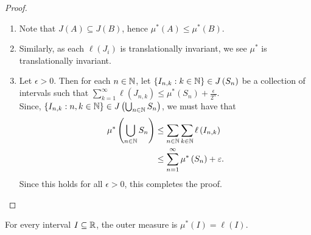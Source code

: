 \begin{proof}
	\begin{enumerate}
		\item Note that \(J\left( A \right) \subseteq J\left( B \right) \), hence \( \mu^{*} \left( A \right)  \le \mu^{*} \left( B \right) \).
		\item Similarly, as each \(\ell\left( J_{i} \right) \) is translationally invariant, we see \( \mu^{*}\) is translationally invariant.
		\item Let \(\epsilon >0\). Then for  each \(n \in \mathbb{N}\), let \(\{I_{n, k} : k \in \mathbb{N}\} \in J\left( S_{n} \right) \) be a collection of intervals such that \(\sum_{k=1}^{\infty} \ell\left( J_{n, k} \right)  \le \mu^{*}\left( S_{n} \right) + \frac{\epsilon}{2^{n}} \).\\
			Since, \(\{I_{n, k} : n, k \in \mathbb{N}\} \in J\left( \bigcup_{n \in \mathbb{N}} S_{n} \right) \), we must have that \begin{align*}
				\mu^{*}\left( \bigcup_{n \in \mathbb{N}} S_{n} \right) &\le \sum_{n \in \mathbb{N}} \sum_{k \in \mathbb{N}}^{} \ell \left( I_{n, k} \right)\\
									       &\le \sum_{n= 1}^{\infty} \mu^{*} \left( S_{n} \right) + \varepsilon
			.\end{align*}
Since this holds for all \(\epsilon > 0\), this completes the proof.
	\end{enumerate}
\end{proof}
\begin{lemma}
	For every interval \(I \subseteq \mathbb{R}\), the outer measure is \( \mu^{*} \left( I \right)  = \ell \left( I \right) \).
\end{lemma}
